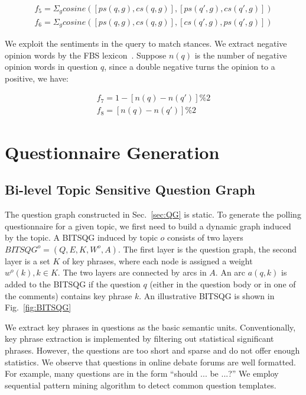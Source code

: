 \documentclass{llncs}
\begin{document}
\begin{eqnarray}
f_5= \Sigma_g cosine([ps(q,g),cs(q,g)],[ps(q',g),cs(q',g)]) \\
f_6=\Sigma_g cosine([ps(q,g),cs(q,g)],[cs(q',g),ps(q',g)])
\end{eqnarray}


We exploit the sentiments in the query to match stances.  We extract negative opinion words by the FBS lexicon~\cite{Hu2004Mining}. Suppose $n(q)$ is the number of negative opinion words in question $q$, since a double negative turns the opinion to a positive, we have:  

\begin{eqnarray}
f_7=1-[n(q)-n(q')]\%2\\
f_8=[n(q)-n(q')]\%2
\end{eqnarray}




\section{Questionnaire Generation}\label{sec:BITSQG}

\subsection{Bi-level Topic Sensitive Question Graph}

The question graph constructed in Sec.~\ref{sec:QG} is static. To generate the polling questionnaire for a given topic, we first need to build a dynamic graph induced by the topic.  A BITSQG induced by topic $o$ consists of two layers  $BITSQG^o=(Q,E,K,W^o,A)$. The first layer is the question graph, the second layer is a set $K$ of key phrases, where each node is assigned a weight $w^o(k),k\in K$. The two layers are connected by arcs in $A$. An arc $a(q,k)$ is added to the BITSQG if the question $q$ (either in the question body or in one of the comments) contains key phrase $k$. An illustrative BITSQG is shown in Fig.~\ref{fig:BITSQG}

We extract key phrases in questions as the basic semantic units. Conventionally, key phrase extraction is implemented by filtering out statistical significant phrases. However, the questions are too short and sparse and do not offer enough statistics. We observe that questions in online debate forums are well formatted. For example, many questions are in the form ``should ... be ...?'' We employ sequential pattern mining algorithm to detect common question templates. 
\end{document}
